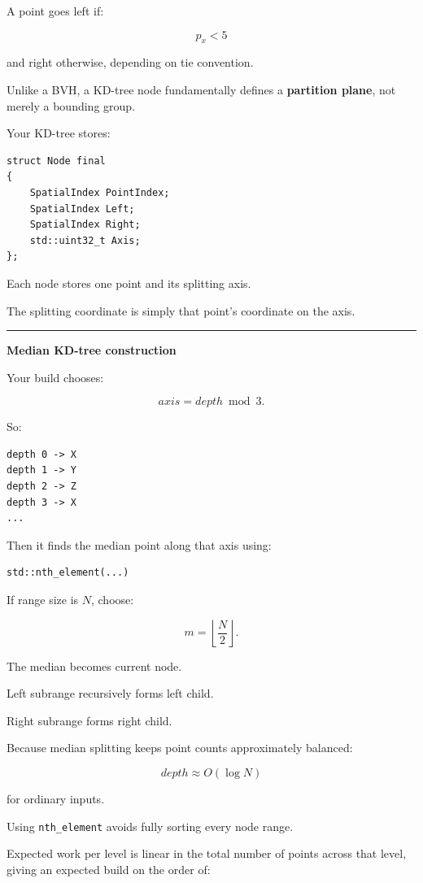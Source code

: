 A point goes left if:

\[
p_x<5
\]

and right otherwise, depending on tie convention.

Unlike a BVH, a KD-tree node fundamentally defines a \textbf{partition plane}, not merely a bounding group.

Your KD-tree stores:

\begin{verbatim}
struct Node final
{
    SpatialIndex PointIndex;
    SpatialIndex Left;
    SpatialIndex Right;
    std::uint32_t Axis;
};
\end{verbatim}

Each node stores one point and its splitting axis.

The splitting coordinate is simply that point's coordinate on the axis.

\begin{center}\rule{0.5\linewidth}{0.5pt}\end{center}

\textbf{Median KD-tree construction}

Your build chooses:

\[
axis=depth\bmod3.
\]

So:

\begin{verbatim}
depth 0 -> X
depth 1 -> Y
depth 2 -> Z
depth 3 -> X
...
\end{verbatim}

Then it finds the median point along that axis using:

\begin{verbatim}
std::nth_element(...)
\end{verbatim}

If range size is \(N\), choose:

\[
m=\left\lfloor\frac N2\right\rfloor.
\]

The median becomes current node.

Left subrange recursively forms left child.

Right subrange forms right child.

Because median splitting keeps point counts approximately balanced:

\[
depth\approx O(\log N)
\]

for ordinary inputs.

Using \texttt{nth\_element} avoids fully sorting every node range.

Expected work per level is linear in the total number of points across that level, giving an expected build on the order of:

